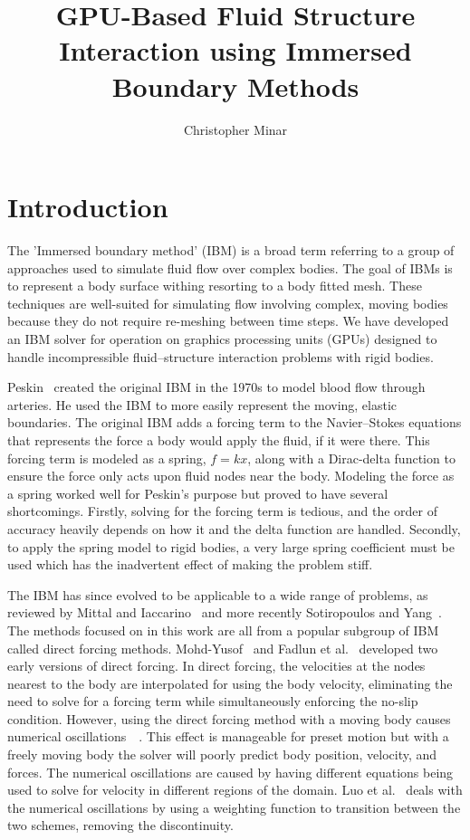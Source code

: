 \documentclass[onehalf,11pt]{beavtex}
\title{GPU-Based Fluid Structure Interaction using Immersed Boundary Methods}
\author{Christopher Minar}
\begin{document}
\maketitle

\mainmatter

\chapter{Introduction}
The 'Immersed boundary method' (IBM) is a broad term referring to a group of approaches used to simulate fluid flow over complex bodies.
The goal of IBMs is to represent a body surface withing resorting to a body fitted mesh.
These techniques are well-suited for simulating flow involving complex, moving bodies because they do not require re-meshing between time steps.
We have developed an IBM solver for operation on graphics processing units (GPUs) designed to handle incompressible fluid--structure interaction problems with rigid bodies.

Peskin~\cite{Peskin:1972gh} created the original IBM in the 1970s to model blood flow through arteries. 
He used the IBM to more easily represent the moving, elastic boundaries.
The original IBM adds a forcing term to the Navier--Stokes equations that represents the force a body would apply the fluid, if it were there.
This forcing term is modeled as a spring, $f=kx$, along with a Dirac-delta function to ensure the force only acts upon fluid nodes near the body.
Modeling the force as a spring worked well for Peskin's purpose but proved to have several shortcomings.
Firstly, solving for the forcing term is tedious, and the order of accuracy heavily depends on how it and the delta function are handled. 
Secondly, to apply the spring model to rigid bodies, a very large spring coefficient must be used which has the inadvertent effect of making the problem stiff. 

The IBM has since evolved to be applicable to a wide range of problems, as reviewed by Mittal and Iaccarino~\cite{Mittal:2005ii} and more recently Sotiropoulos and Yang~\cite{Sotiropoulos:2014gv}. 
The methods focused on in this work are all from a popular subgroup of IBM called direct forcing methods. 
Mohd-Yusof~\cite{MohdYusof:1997wh} and Fadlun et al.~\cite{Fadlun:2000fl} developed two early versions of direct forcing.
In direct forcing, the velocities at the nodes nearest to the body are interpolated for using the body velocity, eliminating the need to solve for a forcing term while simultaneously enforcing the no-slip condition.
However, using the direct forcing method with a moving body causes numerical oscillations~\cite{liao2010simulating}~\cite{Luo:2012gx}.
This effect is manageable for preset motion but with a freely moving body the solver will poorly predict body position, velocity, and forces. 
The numerical oscillations are caused by having different equations being used to solve for velocity in different regions of the domain. 
Luo et al.~\cite{Luo:2012gx} deals with the numerical oscillations by using a weighting function to transition between the two schemes, removing the discontinuity.
\end{document}
